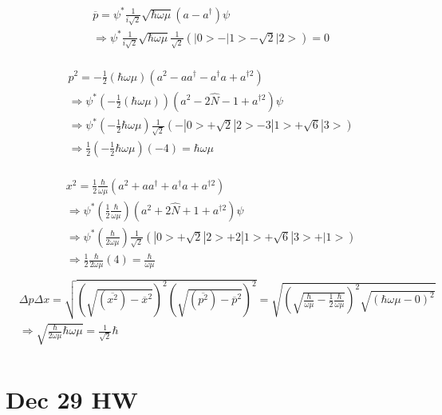 \documentclass{article}
\begin{document}
  \begin{align*}
  &\overline{p}=\psi^*\frac1{i\sqrt{2}}\sqrt{\hbar\omega\mu}(a-a^{\dagger})\psi \\
  &\Rightarrow \psi^*\frac1{i\sqrt{2}}\sqrt{\hbar\omega\mu}\frac1{\sqrt{2}}(|0>-|1>-\sqrt{2}|2>)=0 \\
  \end{align*}

  \begin{align*}
&p^2=-\frac12(\hbar\omega\mu)(a^2-aa^{\dagger}-a^{\dagger}a+a^{\dagger2}) \\
&\Rightarrow \psi^*(-\frac12(\hbar\omega\mu))(a^2-2\hat N-1+a^{\dagger2})\psi \\
&\Rightarrow \psi^*(-\frac12\hbar\omega\mu)\frac1{\sqrt{2}}(-|0>+\sqrt{2}|2>-3|1>+\sqrt{6}|3>)  \\
&\Rightarrow \frac12(-\frac12\hbar\omega\mu)(-4)=\hbar\omega\mu \\
  \end{align*}

  \begin{align*}
&x^2=\frac12\frac{\hbar}{\omega\mu}(a^2+aa^{\dagger}+a^{\dagger}a+a^{\dagger2})\\
&\Rightarrow\psi^*(\frac12\frac{\hbar}{\omega\mu})(a^2+2\hat N+1+a^{\dagger2})\psi \\
&\Rightarrow\psi^*(\frac{\hbar}{2\omega\mu})\frac1{\sqrt{2}}(|0>+\sqrt{2}|2>+2|1>+\sqrt{6}|3>+|1>) \\
&\Rightarrow \frac12 \frac{\hbar}{2\omega\mu}(4)=\frac{\hbar}{\omega\mu} \\
  \end{align*}
  \begin{align*}
  &\Delta p\Delta x=\sqrt{(\sqrt{(\overline{x^2})-\overline{x}^2})^2(\sqrt{(\overline{p^2})-\overline{p}^2})^2}=\sqrt{(\sqrt{\frac{\hbar}{\omega\mu}-\frac12\frac{\hbar}{\omega\mu}})^2\sqrt{(\hbar\omega\mu-0)^2}}\\
  &\Rightarrow \sqrt{\frac{\hbar}{2\omega\mu}\hbar\omega\mu}=\frac1{\sqrt{2}}\hbar \\
  \end{align*}

  \newpage
  \section{Dec 29 HW}
\end{document}
